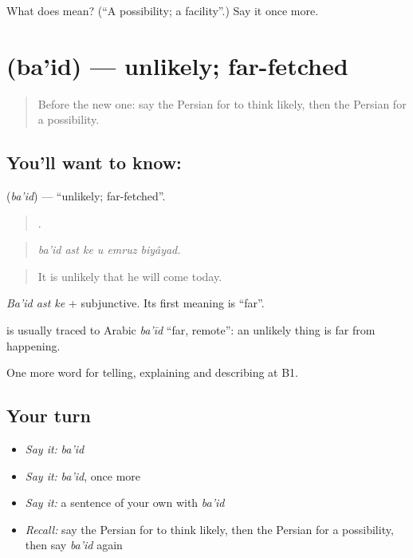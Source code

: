 \begin{tcolorbox}[breakable,colback=teal!4,colframe=teal!35!black,title={Before you move on}]
What does  mean? (\textquotedblleft{}A possibility; a facility\textquotedblright{}.) Say it once more.
\end{tcolorbox}
\section[\texorpdfstring{\fa{بعید} (ba'id)}{بعید (ba'id)}]{ (ba'id) — unlikely; far-fetched}

\label{lesson:FA-C392-baid}



\begin{quote}
Before the new one: say the Persian for to think likely, then the Persian for a possibility.
\end{quote}

\subsection*{You'll want to know: }
\textbf{} (\emph{ba'id}) — \textquotedblleft{}unlikely; far-fetched\textquotedblright{}.

\begin{quote}
     .
\end{quote}

\begin{quote}
\emph{ba'id ast ke u emruz biyâyad.}
\end{quote}

\begin{quote}
It is unlikely that he will come today.
\end{quote}

\emph{Ba'id ast ke} + subjunctive. Its first meaning is \textquotedblleft{}far\textquotedblright{}.

\begin{cousinweb}
\textbf{} is usually traced to Arabic \emph{ba'īd} \textquotedblleft{}far, remote\textquotedblright{}: an unlikely thing is far from happening.
\end{cousinweb}

\begin{grammarlens}[title={What you've built}]
One more word for telling, explaining and describing at B1.
\end{grammarlens}

\subsection*{Your turn}
\begin{itemize}
\raggedright
  \item \emph{Say it:} \emph{ba'id}
  \item \emph{Say it:} \emph{ba'id}, once more
  \item \emph{Say it:} a sentence of your own with \emph{ba'id}
  \item \emph{Recall:} say the Persian for to think likely, then the Persian for a possibility, then say \emph{ba'id} again
\end{itemize}

